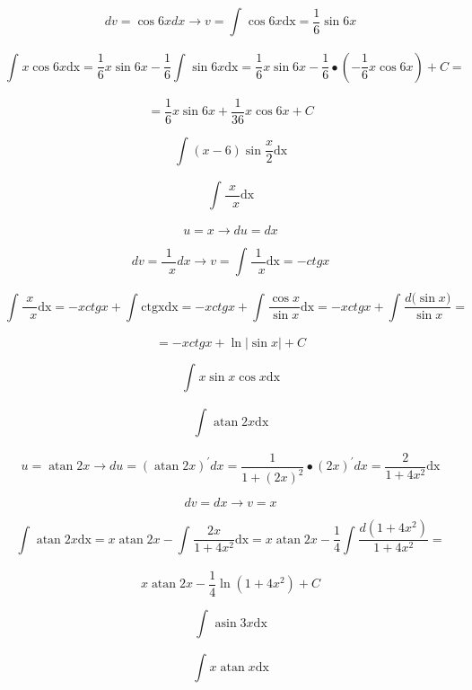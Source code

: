 \documentclass[]{article}
\begin{document}
\[dv = \cos{6x}dx \rightarrow v = \int_{}^{}{\cos{6x}\text{dx}} = \frac{1}{6}\sin{6x}\]

\[\int_{}^{}{x\cos{6x}\text{dx}} = \frac{1}{6}x\sin{6x} - \frac{1}{6}\int_{}^{}{\sin{6x}\text{dx}} = \frac{1}{6}x\sin{6x} - \frac{1}{6} \bullet \left( - \frac{1}{6}x\cos{6x} \right) + C =\]

\[= \frac{1}{6}x\sin{6x} + \frac{1}{36}x\cos{6x} + C\]

\[\int_{}^{}{(x - 6)\sin\frac{x}{2}\text{dx}}\]

\[\int_{}^{}{\frac{x}{\operatorname{}x}\text{dx}}\]

\[u = x \rightarrow du = dx\]

\[dv = \frac{1}{\operatorname{}x}dx \rightarrow v = \int_{}^{}{\frac{1}{\operatorname{}x}\text{dx}} = - ctgx\]

\[\int_{}^{}{\frac{x}{\operatorname{}x}\text{dx}} = - xctgx + \int_{}^{}{\text{ctgx}\text{dx}} = - xctgx + \int_{}^{}{\frac{\cos x}{\sin x}\text{dx}} = - xctgx + \int_{}^{}\frac{d(\sin{x)}}{\sin x} =\]

\[= - xctgx + \ln\left| \sin x \right| + C\]

\[\int_{}^{}{x\sin x\cos x\text{dx}}\]

\[\int_{}^{}{\operatorname{atan}{2x}\text{dx}}\]

\[u = \operatorname{atan}{2x} \rightarrow du = \left( \operatorname{atan}{2x} \right)^{'}dx = \frac{1}{1 + \left( 2x \right)^{2}} \bullet \left( 2x \right)^{'}dx = \frac{2}{1 + 4x^{2}}\text{dx}\]

\[dv = dx \rightarrow v = x\]

\[\int_{}^{}{\operatorname{atan}{2x}\text{dx}} = x\operatorname{atan}{2x} - \int_{}^{}{\frac{2x}{1 + 4x^{2}}\text{dx}} = x\operatorname{atan}{2x} - \frac{1}{4}\int_{}^{}\frac{d\left( 1 + 4x^{2} \right)}{1 + 4x^{2}} =\]

\[x\operatorname{atan}{2x} - \frac{1}{4}\ln\left( 1 + 4x^{2} \right) + C\]

\[\int_{}^{}{\operatorname{asin}{3x}\text{dx}}\]

\[\int_{}^{}{x\operatorname{atan}x\text{dx}}\]
\end{document}
